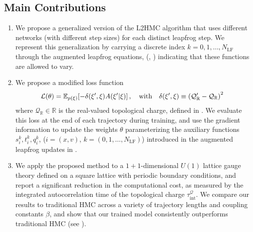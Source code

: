 \documentclass{article} %
\begin{document}
\subsection{\label{subsec:main_contributions}Main Contributions}
\begin{enumerate}
   \item We propose a generalized version of the L2HMC algorithm that uses different networks (with different step
      sizes) for each distinct leapfrog step.
      We represent this generalization by carrying a discrete index \(k = 0, 1, \ldots, N_{\mathrm{LF}}\) through the
      augmented leapfrog equations, (, ) indicating that
      these functions are allowed to vary.
   \item We propose a modified loss function
      \begin{equation}
          \mathcal{L}(\theta) = \mathbb{E}_{p(\xi)}{%
              \left[-\delta(\xi^{\prime}, \xi) A(\xi^{\prime}|\xi)\right],\quad\text{with}\quad%
          \delta(\xi^{\prime}, \xi) \equiv
      {\left(\mathcal{Q}_{\mathbb{R}}^{\prime}-\mathcal{Q}_{\mathbb{R}}\right)}^{2}
          }
      \end{equation}
      where \(\mathcal{Q}_{\mathbb{R}}\in\mathbb{R}\) is the real-valued topological charge, defined in .
      We evaluate this loss at the end of each trajectory during training, and use the gradient information to update
      the weights \(\theta\) parameterizing the auxiliary functions \(s^{k}_{i}, t^{k}_{i}, q^{k}_{i}\), (\(i =(x, v)\), \(k = (0, 1, \ldots, N_{\mathrm{LF}})\))
      introduced in the augmented leapfrog updates in .
   \item We apply the proposed method to a \(1+1\)-dimensional \(U(1)\) lattice gauge theory defined on a
      square lattice with periodic boundary conditions, and report a significant reduction in the
      computational cost, as measured by the integrated autocorrelation time of the topological charge
      \(\tau_{\mathrm{int}}^{\mathcal{Q}}\).
      We compare our results to traditional HMC across a variety of trajectory lengths and coupling constants
      \(\beta\), and show that our trained model consistently outperforms traditional HMC (see
      ).
\end{enumerate}
%
\end{document}
